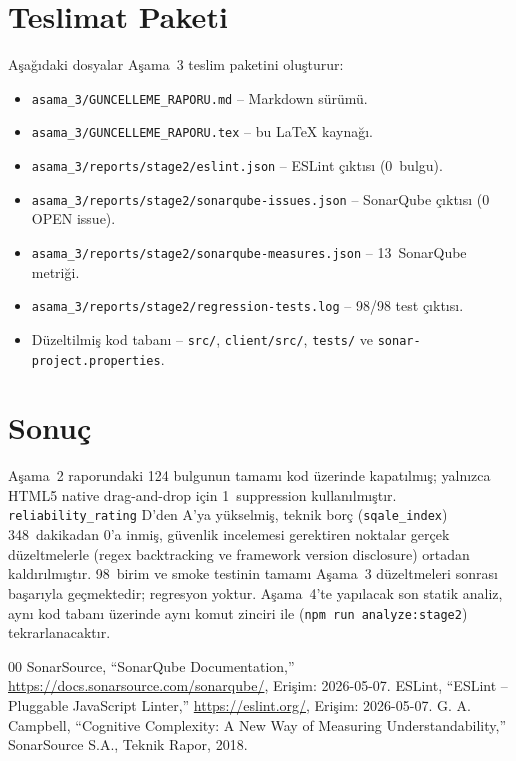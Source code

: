\documentclass[conference]{IEEEtran}
\begin{document}
\section{Teslimat Paketi}

Aşağıdaki dosyalar Aşama~3 teslim paketini oluşturur:

\begin{itemize}
\item \texttt{asama\_3/GUNCELLEME\_RAPORU.md} -- Markdown sürümü.
\item \texttt{asama\_3/GUNCELLEME\_RAPORU.tex} -- bu LaTeX kaynağı.
\item \texttt{asama\_3/reports/stage2/eslint.json} -- ESLint çıktısı
  (0~bulgu).
\item \texttt{asama\_3/reports/stage2/sonarqube-issues.json} -- SonarQube
  çıktısı (0 OPEN issue).
\item \texttt{asama\_3/reports/stage2/sonarqube-measures.json} --
  13~SonarQube metriği.
\item \texttt{asama\_3/reports/stage2/regression-tests.log} -- 98/98
  test çıktısı.
\item Düzeltilmiş kod tabanı -- \texttt{src/}, \texttt{client/src/},
  \texttt{tests/} ve \texttt{sonar-project.properties}.
\end{itemize}

\section{Sonuç}

Aşama~2 raporundaki 124 bulgunun tamamı kod üzerinde kapatılmış;
yalnızca HTML5 native drag-and-drop için 1~suppression kullanılmıştır.
\texttt{reliability\_rating} D'den A'ya yükselmiş, teknik borç (\texttt{sqale\_index})
348~dakikadan 0'a inmiş, güvenlik incelemesi gerektiren noktalar gerçek
düzeltmelerle (regex backtracking ve framework version disclosure)
ortadan kaldırılmıştır. 98~birim ve smoke testinin tamamı Aşama~3
düzeltmeleri sonrası başarıyla geçmektedir; regresyon yoktur. Aşama~4'te
yapılacak son statik analiz, aynı kod tabanı üzerinde aynı komut zinciri
ile (\texttt{npm run analyze:stage2}) tekrarlanacaktır.

\begin{thebibliography}{00}
 SonarSource, ``SonarQube Documentation,''
  \url{https://docs.sonarsource.com/sonarqube/}, Erişim: 2026-05-07.
 ESLint, ``ESLint -- Pluggable JavaScript Linter,''
  \url{https://eslint.org/}, Erişim: 2026-05-07.
 G. A. Campbell, ``Cognitive Complexity: A New Way of
  Measuring Understandability,'' SonarSource S.A., Teknik Rapor, 2018.
\end{thebibliography}
\end{document}
